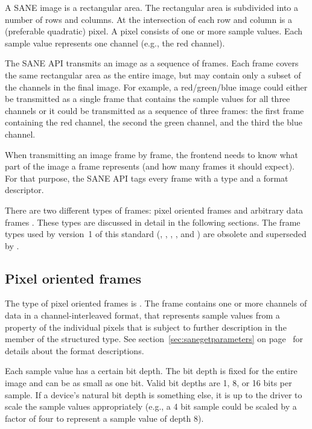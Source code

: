 \documentclass[11pt,DVIps]{report}
\begin{document}
A SANE image is a rectangular area.  The rectangular area is subdivided into a
number of rows and columns.  At the intersection of each row and column is a
(preferable quadratic) pixel. A pixel consists of one or more sample values.
Each sample value represents one channel (e.g., the red channel).

The SANE API transmits an image as a sequence of frames.  Each frame covers
the same rectangular area as the entire image, but may contain only a subset
of the channels in the final image.  For example, a red/green/blue image could
either be transmitted as a single frame that contains the sample values for
all three channels or it could be transmitted as a sequence of three frames:
the first frame containing the red channel, the second the green channel, and
the third the blue channel.

When transmitting an image frame by frame, the frontend needs to know what
part of the image a frame represents (and how many frames it should expect).
For that purpose, the SANE API tags every frame with a type and a format
descriptor.

\begin{changebar}
  There are two different types of frames: pixel oriented frames
   and arbitrary data frames
  . These types are discussed in detail in the
  following sections. The frame types used by version~1 of this standard
  (, ,
  , , and
  ) are obsolete and superseded by
  .

  \subsection{Pixel oriented frames}

  The type of pixel oriented frames is . The
  frame contains one or more channels of data in a channel-interleaved format,
  that represents sample values from a property of the individual pixels that
  is subject to further description in the  member of the
   structured type. See section~\ref{sec:sanegetparameters}
  on page~\pageref{sec:sanegetparameters} for details about the format
  descriptions.
\end{changebar}

  Each sample value has a certain bit depth.  The bit depth is fixed for the
  entire image and can be as small as one bit. Valid bit depths are 1, 8, or
  16 bits per sample. If a device's natural bit depth is something else, it is
  up to the driver to scale the sample values appropriately (e.g., a 4 bit
  sample could be scaled by a factor of four to represent a sample value of
  depth 8).
\end{document}
